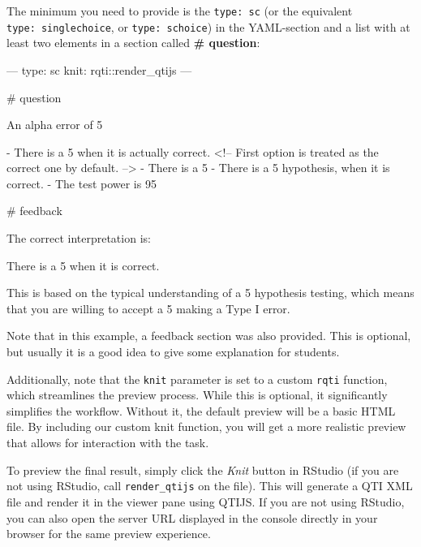 \documentclass[twoside]{tufte-book}
\newenvironment{Shaded}{}{}
\begin{document}
The minimum you need to provide is the \texttt{type:\ sc} (or the equivalent \texttt{type:\ singlechoice}, or \texttt{type:\ schoice}) in the YAML-section and a list with at least two elements in a section called \textbf{\# question}:

\begin{Shaded}
\begin{Highlighting}
---
type: sc
knit: rqti::render_qtijs
---

# question

An alpha error of 5% means that:

- There is a 5% probability that you will mistakenly reject the null hypothesis,
when it is actually correct. <!-- First option is treated as the correct one by
default. -->
- There is a 5% probability that the null hypothesis is correct.
- There is a 5% probability that you will mistakenly reject the alternative
hypothesis, when it is correct.
- The test power is 95%.

# feedback

The correct interpretation is:

There is a 5% probability that you will mistakenly reject the null hypothesis,
when it is correct.

This is based on the typical understanding of a 5% significance level in
hypothesis testing, which means that you are willing to accept a 5% chance of
making a Type I error.
\end{Highlighting}
\end{Shaded}

Note that in this example, a feedback section was also provided. This is optional, but usually it is a good idea to give some explanation for students.

Additionally, note that the \texttt{knit} parameter is set to a custom \texttt{rqti} function, which streamlines the preview process. While this is optional, it significantly simplifies the workflow. Without it, the default preview will be a basic HTML file. By including our custom knit function, you will get a more realistic preview that allows for interaction with the task.

To preview the final result, simply click the \emph{Knit} button in RStudio (if you are not using RStudio, call \texttt{render\_qtijs} on the file). This will generate a QTI XML file and render it in the viewer pane using QTIJS. If you are not using RStudio, you can also open the server URL displayed in the console directly in your browser for the same preview experience.
\end{document}
